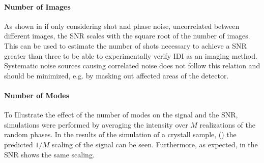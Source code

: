 \paragraph{Number of Images}
As shown in  if only considering shot and phase noise, uncorrelated between different  images, the SNR scales with the square root of the number of images.  This can be used to estimate the number of shots necessary to achieve a SNR greater than three to be able to experimentally verify IDI as an imaging method. Systematic noise sources causing correlated noise does not follow this relation and should be minimized, e.g. by masking out affected areas of the detector.
 
\paragraph{Number of Modes}
To Illustrate the effect of the number of modes on the signal and the SNR, simulations were performed by averaging the intensity over $M$ realizations of the random phases.  In the results of the simulation of a crystall sample, () the predicted $1/M$ scaling of the signal can be seen. Furthermore, as expected, in  the SNR shows the same scaling.

